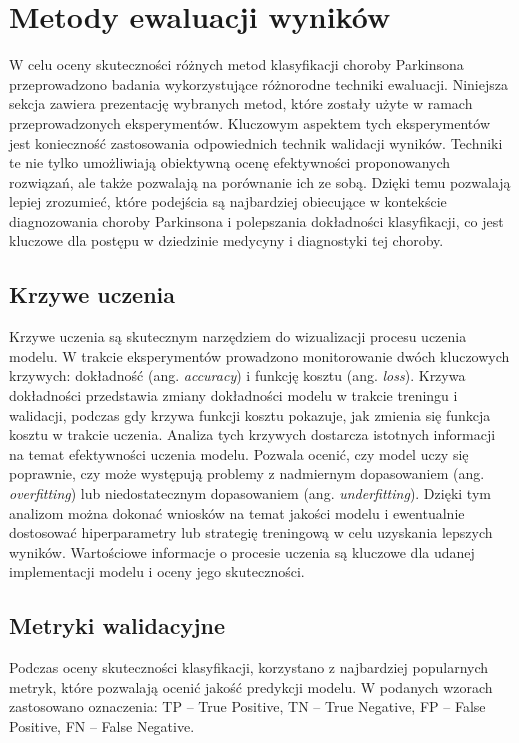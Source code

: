 \section{Metody ewaluacji wyników}
\label{sec:metody-ewaluacji-wynikow}

W celu oceny skuteczności różnych metod klasyfikacji choroby Parkinsona przeprowadzono badania wykorzystujące różnorodne techniki ewaluacji.
Niniejsza sekcja zawiera prezentację wybranych metod, które zostały użyte w ramach przeprowadzonych eksperymentów.
Kluczowym aspektem tych eksperymentów jest konieczność zastosowania odpowiednich technik walidacji wyników.
Techniki te nie tylko umożliwiają obiektywną ocenę efektywności proponowanych rozwiązań, ale także pozwalają na porównanie ich ze sobą.
Dzięki temu pozwalają lepiej zrozumieć, które podejścia są najbardziej obiecujące w kontekście diagnozowania choroby Parkinsona i polepszania dokładności klasyfikacji, co jest kluczowe dla postępu w dziedzinie medycyny i diagnostyki tej choroby.

\subsection{Krzywe uczenia}
\label{subsec:krzywe-uczenia}

Krzywe uczenia są skutecznym narzędziem do wizualizacji procesu uczenia modelu.
W trakcie eksperymentów prowadzono monitorowanie dwóch kluczowych krzywych: dokładność (ang. \emph{accuracy}) i funkcję kosztu (ang. \emph{loss}).
Krzywa dokładności przedstawia zmiany dokładności modelu w trakcie treningu i walidacji, podczas gdy krzywa funkcji kosztu pokazuje, jak zmienia się funkcja kosztu w trakcie uczenia.
Analiza tych krzywych dostarcza istotnych informacji na temat efektywności uczenia modelu.
Pozwala ocenić, czy model uczy się poprawnie, czy może występują problemy z nadmiernym dopasowaniem  (ang. \emph{overfitting}) lub niedostatecznym dopasowaniem (ang. \emph{underfitting}).
Dzięki tym analizom można dokonać wniosków na temat jakości modelu i ewentualnie dostosować hiperparametry lub strategię treningową w celu uzyskania lepszych wyników.
Wartościowe informacje o procesie uczenia są kluczowe dla udanej implementacji modelu i oceny jego skuteczności.

\subsection{Metryki walidacyjne}
\label{subsec:metryki-waldiacyjne}

Podczas oceny skuteczności klasyfikacji, korzystano z najbardziej popularnych metryk, które pozwalają ocenić jakość predykcji modelu.
W podanych wzorach zastosowano oznaczenia:  TP – True Positive, TN – True Negative, FP – False Positive, FN – False Negative.

